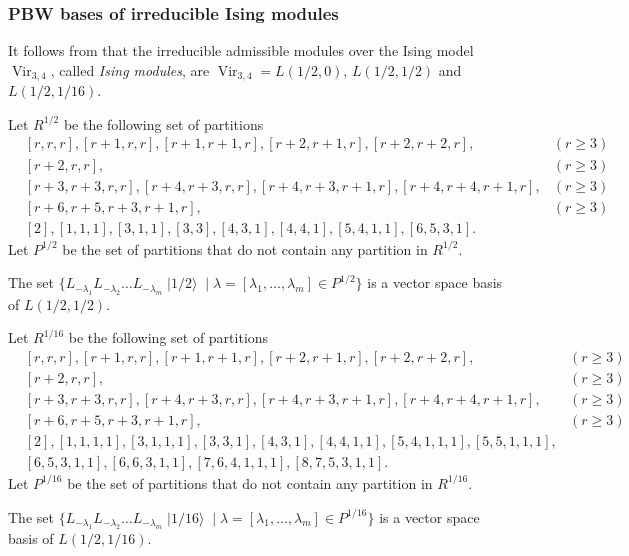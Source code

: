 \documentclass{beamer}
\DeclareMathOperator{\Vir}{Vir}
\DeclareMathOperator{\vachalf}{|1/2\rangle}
\DeclareMathOperator{\vacsixteen}{|1/16\rangle}
\begin{document}
\begin{frame}
  \frametitle{PBW bases of irreducible Ising modules}

  It follows from  that the irreducible admissible modules over the Ising model $\Vir_{3, 4}$, called \emph{Ising modules}, are $\Vir_{3, 4} = L(1/2, 0)$, $L(1/2, 1/2)$ and $L(1/2, 1/16)$.

  Let $R^{1/2}$ be the following set of partitions
  \footnotesize
  \begin{align*}
    &[r, r, r], [r + 1, r, r], [r + 1, r + 1, r], [r + 2, r + 1, r], [r + 2, r + 2, r], &(r \ge 3) \\
    &[r + 2, r, r], &(r \ge 3) \\
    &[r + 3, r + 3, r, r], [r + 4, r + 3, r, r],  [r + 4, r + 3, r + 1, r], [r + 4, r + 4, r + 1, r], &(r \ge 3)\\
    &[r + 6, r + 5, r + 3, r + 1, r], &(r \ge 3) \\
    &[2], [1, 1, 1], [3, 1, 1], [3, 3], [4, 3, 1], [4, 4, 1], [5, 4, 1, 1], [6, 5, 3, 1].
  \end{align*}
  \normalsize
  Let $P^{1/2}$ be the set of partitions that do not contain any partition in $R^{1/2}$.

  \begin{theorem}
    \label{thr:7}
    The set $\{L_{-\lambda_1}L_{-\lambda_2}\dots L_{-\lambda_m}\vachalf \mid \lambda = [\lambda_1, \dots, \lambda_m] \in P^{1/2}\}$ is a vector space basis of $L(1/2, 1/2)$.
  \end{theorem}

\end{frame}

\begin{frame}

  Let $R^{1/16}$ be the following set of partitions
  \footnotesize
  \begin{align*}
    &[r, r, r], [r + 1, r, r], [r + 1, r + 1, r], [r + 2, r + 1, r], [r + 2, r + 2, r], &(r \ge 3) \\
    &[r + 2, r, r], &(r \ge 3) \\
    &[r + 3, r + 3, r, r], [r + 4, r + 3, r, r],  [r + 4, r + 3, r + 1, r], [r + 4, r + 4, r + 1, r], &(r \ge 3)\\
    &[r + 6, r + 5, r + 3, r + 1, r], &(r \ge 3) \\
    &[2], [1, 1, 1, 1], [3, 1, 1, 1], [3, 3, 1], [4, 3, 1], [4, 4, 1, 1], [5, 4, 1, 1, 1], [5, 5, 1, 1, 1], \\
    &[6, 5, 3, 1, 1], [6, 6, 3, 1, 1], [7, 6, 4, 1, 1, 1], [8, 7, 5, 3, 1, 1].
  \end{align*}
  \normalsize
  Let $P^{1/16}$ be the set of partitions that do not contain any partition in $R^{1/16}$.

  \begin{theorem}
    The set $\{L_{-\lambda_1}L_{-\lambda_2}\dots L_{-\lambda_m}\vacsixteen \mid \lambda = [\lambda_1, \dots, \lambda_m] \in P^{1/16}\}$ is a vector space basis of $L(1/2, 1/16)$.
  \end{theorem}

\end{frame}
\end{document}
